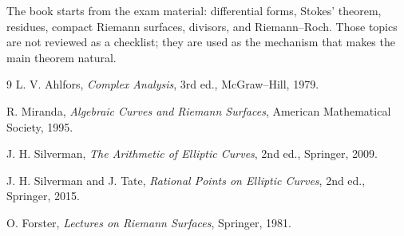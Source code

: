 \documentclass[11pt]{book}
\begin{document}
The book starts from the exam material: differential forms, Stokes' theorem,
residues, compact Riemann surfaces, divisors, and Riemann--Roch.  Those topics
are not reviewed as a checklist; they are used as the mechanism that makes the
main theorem natural.




\tableofcontents

\mainmatter
\flushbottom


















\appendix




\backmatter

\begin{thebibliography}{9}
L. V. Ahlfors, \emph{Complex Analysis}, 3rd ed., McGraw--Hill, 1979.

R. Miranda, \emph{Algebraic Curves and Riemann Surfaces}, American Mathematical
Society, 1995.

J. H. Silverman, \emph{The Arithmetic of Elliptic Curves}, 2nd ed., Springer,
2009.

J. H. Silverman and J. Tate, \emph{Rational Points on Elliptic Curves}, 2nd ed.,
Springer, 2015.

O. Forster, \emph{Lectures on Riemann Surfaces}, Springer, 1981.
\end{thebibliography}
\end{document}
